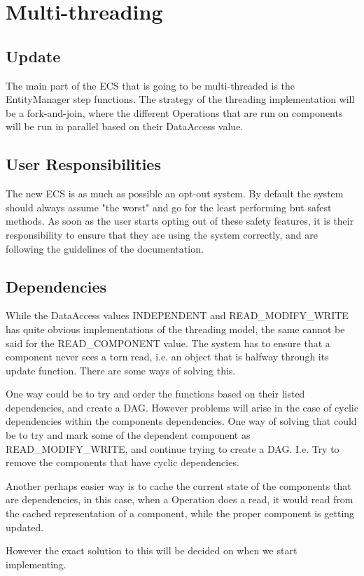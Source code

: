 \section{Multi-threading}
\subsection{Update}
The main part of the ECS that is going to be multi-threaded is the EntityManager step functions.
The strategy of the threading implementation will be a fork-and-join\cite{wikipedia_fork_and_join}, 
where the different Operations that are run on components will be run in parallel based on their DataAccess value.

\subsection{User Responsibilities}
The new ECS is as much as possible an opt-out system. By default the system should always assume "the worst" and go for the least performing but safest methods. 
As soon as the user starts opting out of these safety features, 
it is their responsibility to ensure that they are using the system correctly, and are following the guidelines of the documentation.

\subsection{Dependencies}
While the DataAccess values INDEPENDENT and READ\_MODIFY\_WRITE has quite obvious implementations of the threading model, 
the same cannot be said for the READ\_COMPONENT value. 
The system has to ensure that a component never sees a torn read, i.e. an object that is halfway through its update function.
There are some ways of solving this.

One way could be to try and order the functions based on their listed dependencies, and create a DAG. 
However problems will arise in the case of cyclic dependencies within the components dependencies. 
One way of solving that could be to try and mark some of the dependent component as READ\_MODIFY\_WRITE, and continue trying to create a DAG. I.e. Try to remove the components that have cyclic dependencies.

Another perhaps easier way is to cache the current state of the components that are dependencies, in this case, when a Operation does a read, it would read from the cached representation of a component, while the proper component is getting updated.

However the exact solution to this will be decided on when we start implementing.
